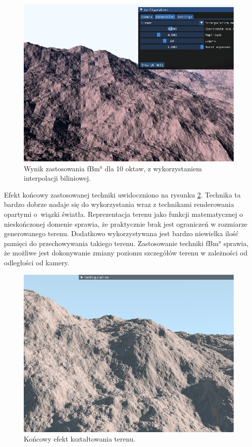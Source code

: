 \begin{figure}
\centering
\includegraphics[width=1\textwidth]{./graf/fbm-bilin.png}
\caption{Wynik zastosowania \ang{fBm} dla 10 oktaw, z wykorzystaniem interpolacji biliniowej.}
\label{fig:fbm-bilin-align}
\end{figure}

Efekt końcowy zastosowanej techniki uwidoczniono na rysunku \ref{fig:gen-end}. Technika ta bardzo dobrze nadaje się do wykorzystania wraz z technikami renderowania opartymi o~wiązki światła. Reprezentacja terenu jako funkcji matematycznej o nieskończonej domenie sprawia, że praktycznie brak jest ograniczeń w rozmiarze generowanego terenu. Dodatkowo wykorzystywana jest bardzo niewielka ilość pamięci do przechowywania takiego terenu. Zastosowanie techniki \ang{fBm} sprawia, że możliwe jest dokonywanie zmiany poziomu szczegółów terenu w zależności od odległości od kamery.

\begin{figure}[H]
\centering
\includegraphics[width=1\textwidth]{./graf/gen-end.png}
\caption{Końcowy efekt kształtowania terenu.}
\label{fig:gen-end}
\end{figure}

